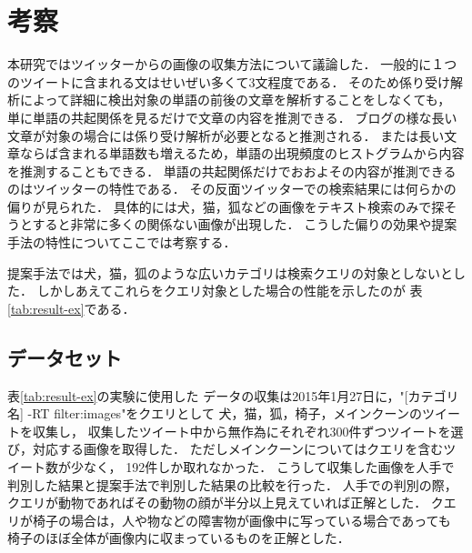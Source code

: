 \chapter{考察}
\label{sec:examination}

本研究ではツイッターからの画像の収集方法について議論した．
一般的に１つのツイートに含まれる文はせいぜい多くて3文程度である．
そのため係り受け解析によって詳細に検出対象の単語の前後の文章を解析することをしなくても，
単に単語の共起関係を見るだけで文章の内容を推測できる．
ブログの様な長い文章が対象の場合には係り受け解析が必要となると推測される．
または長い文章ならば含まれる単語数も増えるため，単語の出現頻度のヒストグラムから内容を推測することもできる．
単語の共起関係だけでおおよその内容が推測できるのはツイッターの特性である．
その反面ツイッターでの検索結果には何らかの偏りが見られた．
具体的には犬，猫，狐などの画像をテキスト検索のみで探そうとすると非常に多くの関係ない画像が出現した．
こうした偏りの効果や提案手法の特性についてここでは考察する．

提案手法では犬，猫，狐のような広いカテゴリは検索クエリの対象としないとした．
しかしあえてこれらをクエリ対象とした場合の性能を示したのが
表\ref{tab:result-ex}である．



\section{データセット}

表\ref{tab:result-ex}の実験に使用した
データの収集は2015年1月27日に，"[カテゴリ名] -RT filter:images"をクエリとして
犬，猫，狐，椅子，メインクーンのツイートを収集し，
収集したツイート中から無作為にそれぞれ300件ずつツイートを選び，対応する画像を取得した．
ただしメインクーンについてはクエリを含むツイート数が少なく，
192件しか取れなかった．
%
%
こうして収集した画像を人手で判別した結果と提案手法で判別した結果の比較を行った．
%
人手での判別の際，クエリが動物であればその動物の顔が半分以上見えていれば正解とした．
クエリが椅子の場合は，人や物などの障害物が画像中に写っている場合であっても
椅子のほぼ全体が画像内に収まっているものを正解とした．

